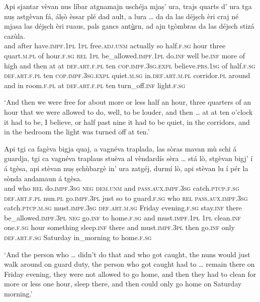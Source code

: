 \begin{linenumbers}
\gll    Api sjantar vèvan nus líbar atgnamajn uschéja mjaṣ’ ura, trajs quarts d’ ura tga nuṣ astgèvan fá, álṣò èssar plé dad ault, a lura … da da las déjṣch èri craj né mjasa las déjṣch èri ruaus, pals gancs ant\underline{ù}rn, ad ajn tgòmbras da las déjsch stizá cazùla.\\
and after have.\textsc{impf.1pl} \textsc{1pl} free.\textsc{adj.unm} actually so half.\textsc{f.sg} hour three quart.\textsc{m.pl}  of hour.\textsc{f.sg} \textsc{rel} \textsc{1pl} be\_allowed.\textsc{impf.1pl}  do.\textsc{inf} well be.\textsc{inf} more of high and then {} at at \textsc{def.art.f.pl} ten \textsc{cop.impf.3sg.expl} believe.\textsc{prs.1sg} of  half.\textsc{f.sg} \textsc{def.art.f.pl} ten \textsc{cop.impf.3sg.expl} quiet.\textsc{m.sg} in.\textsc{def.art.m.pl} corridor.\textsc{pl} around and in room.\textsc{f.pl} at \textsc{def.art.f.pl} ten turn\_off.\textsc{inf} light.\textsc{f.sg}\\
\end{linenumbers}
\medskip
\glt `And then we were free for about more or less half an hour, three quarters of an hour that we were allowed to do, well, to be louder, and then … at at ten o’clock it had to be, I believe, or half past nine it had to be quiet, in the corridors, and in the bedroom the light was turned off at ten.'
\medskip

\begin{linenumbers}
\gll    Api tgi ca fagèva bigja quaj, a vagnéva traplada, las sòras mavan mù schi á guardja, tgi ca vagnéva traplaus stuèva al vèndardís sèra … stá lò, stgèvan bigj’ í á tgèsa, api stèvan nuṣ ṣchùbargè in’ ura zatgéj, durmí lò, api stèvan lu í pér la sònda andamaun á tgèsa.\\
and who \textsc{rel} do.\textsc{impf.3sg} \textsc{neg} \textsc{dem.unm} and \textsc{pass.aux.impf.3sg} catch.\textsc{ptcp.f.sg} \textsc{def.art.f.pl} nun.\textsc{pl} go.\textsc{impf.3pl} just so to guard.\textsc{f.sg}  who \textsc{rel} \textsc{pass.aux.impf.3sg} catch.\textsc{ptcp.m.sg} must.\textsc{impf.3sg} \textsc{def.art.m.sg} Friday evening.\textsc{f.sg} {} stay.\textsc{inf} there be\_allowed.\textsc{impf.3pl} \textsc{neg} go.\textsc{inf} to home.\textsc{f.sg} and must.\textsc{impf.1pl} \textsc{1pl} clean.\textsc{inf} one.\textsc{f.sg} hour something sleep.\textsc{inf} there and must.\textsc{impf.3pl} then go.\textsc{inf} only \textsc{def.art.f.sg} Saturday in\_morning to home.\textsc{f.sg}\\
\end{linenumbers}
\medskip
\glt `And the person who … didn’t do that and who got caught, the nuns would just walk around on guard duty, the person who got caught had to … remain there on Friday evening, they were not allowed to go home, and then they had to clean for more or less one hour, sleep there, and then could only go home on Saturday morning.'
\medskip

